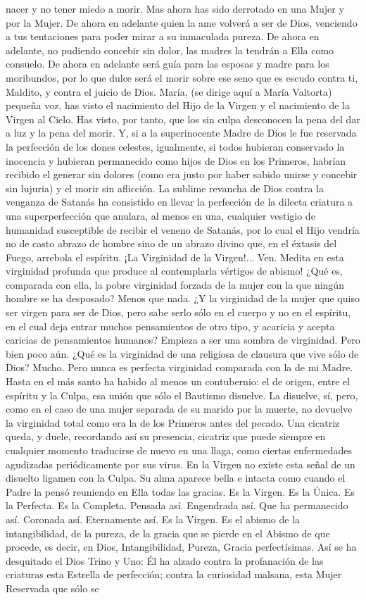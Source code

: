 \documentclass[12pt, twoside, openright]{book} %
\begin{document}
nacer y no tener miedo a morir. Mas ahora has sido derrotado en una Mujer y por la Mujer. De ahora en adelante quien la ame volverá a ser de Dios, venciendo a tus tentaciones para poder mirar a su inmaculada pureza. De ahora en adelante, no pudiendo concebir sin dolor, las madres la tendrán a Ella como consuelo. De ahora en adelante será guía para las esposas y madre para los moribundos, por lo que dulce será el morir sobre ese seno que es escudo contra ti, Maldito, y contra el juicio de Dios. María, (se dirige aquí a María Valtorta) pequeña voz, has visto el nacimiento del Hijo de la Virgen y el nacimiento de la Virgen al Cielo. Has visto, por tanto, que los sin culpa desconocen la pena del dar a luz y la pena del morir. Y, si a la superinocente Madre de Dios le fue reservada la perfección de los dones celestes, igualmente, si todos hubieran conservado la inocencia y hubieran permanecido como hijos de Dios en los Primeros, habrían recibido el generar sin dolores (como era justo por haber sabido unirse y concebir sin lujuria) y el morir sin aflicción. La sublime revancha de Dios contra la venganza de Satanás ha consistido en llevar la perfección de la dilecta criatura a una superperfección que anulara, al menos en una, cualquier vestigio de humanidad susceptible de recibir el veneno de Satanás, por lo cual el Hijo vendría no de casto abrazo de hombre sino de un abrazo divino que, en el éxtasis del Fuego, arrebola el espíritu. ¡La Virginidad de la Virgen!... Ven. Medita en esta virginidad profunda que produce al contemplarla vértigos de abismo! ¿Qué es, comparada con ella, la pobre virginidad forzada de la mujer con la que ningún hombre se ha desposado? Menos que nada. ¿Y la virginidad de la mujer que quiso ser virgen para ser de Dios, pero sabe serlo sólo en el cuerpo y no en el espíritu, en el cual deja entrar muchos pensamientos de otro tipo, y acaricia y acepta caricias de pensamientos humanos? Empieza a ser una sombra de virginidad. Pero bien poco aún. ¿Qué es la virginidad de una religiosa de clausura que vive sólo de Dios? Mucho. Pero nunca es perfecta virginidad comparada con la de mi Madre. Hasta en el más santo ha habido al menos un contubernio: el de origen, entre el espíritu y la Culpa, esa unión que sólo el Bautismo disuelve. La disuelve, sí, pero, como en el caso de una mujer separada de su marido por la muerte, no devuelve la virginidad total como era la de los Primeros antes del pecado. Una cicatriz queda, y duele, recordando así su presencia, cicatriz que puede siempre en cualquier momento traducirse de nuevo en una llaga, como ciertas enfermedades agudizadas periódicamente por sus virus. En la Virgen no existe esta señal de un disuelto ligamen con la Culpa. Su alma aparece bella e intacta como cuando el Padre la pensó reuniendo en Ella todas las gracias. Es la Virgen. Es la Única. Es la Perfecta. Es la Completa. Pensada así. Engendrada así. Que ha permanecido así. Coronada así. Eternamente así. Es la Virgen. Es el abismo de la intangibilidad, de la pureza, de la gracia que se pierde en el Abismo de que procede, es decir, en Dios, Intangibilidad, Pureza, Gracia perfectísimas. Así se ha desquitado el Dios Trino y Uno: Él ha alzado contra la profanación de las criaturas esta Estrella de perfección; contra la curiosidad malsana, esta Mujer Reservada que sólo se 
\end{document}
